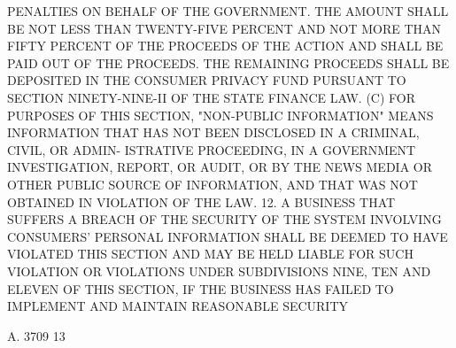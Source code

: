  PENALTIES ON BEHALF OF THE GOVERNMENT. THE AMOUNT SHALL BE NOT LESS THAN
 TWENTY-FIVE  PERCENT  AND NOT MORE THAN FIFTY PERCENT OF THE PROCEEDS OF
 THE ACTION AND SHALL BE PAID OUT OF THE PROCEEDS. THE REMAINING PROCEEDS
 SHALL BE DEPOSITED IN THE CONSUMER  PRIVACY  FUND  PURSUANT  TO  SECTION
 NINETY-NINE-II OF THE STATE FINANCE LAW.
   (C)  FOR  PURPOSES  OF  THIS  SECTION,  "NON-PUBLIC INFORMATION" MEANS
 INFORMATION THAT HAS NOT BEEN DISCLOSED IN A CRIMINAL, CIVIL, OR  ADMIN-
 ISTRATIVE  PROCEEDING,  IN A GOVERNMENT INVESTIGATION, REPORT, OR AUDIT,
 OR BY THE NEWS MEDIA OR OTHER PUBLIC SOURCE OF INFORMATION, AND THAT WAS
 NOT OBTAINED IN VIOLATION OF THE LAW.
   12. A BUSINESS THAT SUFFERS A BREACH OF THE  SECURITY  OF  THE  SYSTEM
 INVOLVING  CONSUMERS'  PERSONAL  INFORMATION  SHALL  BE  DEEMED  TO HAVE
 VIOLATED THIS SECTION AND MAY BE  HELD  LIABLE  FOR  SUCH  VIOLATION  OR
 VIOLATIONS  UNDER  SUBDIVISIONS NINE, TEN AND ELEVEN OF THIS SECTION, IF
 THE BUSINESS HAS FAILED TO IMPLEMENT AND  MAINTAIN  REASONABLE  SECURITY

 A. 3709                            13
 
